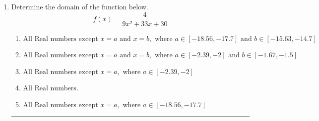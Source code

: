 \documentclass[14pt]{extbook}
\newcommand{\litem}[1]{\item#1\hspace*{-1cm}\rule{\textwidth}{0.4pt}}
\begin{document}
\begin{enumerate}
{\begin{enumerate}[label=\Alph*.]
\end{enumerate} }
\litem{
Determine the domain of the function below.\[ f(x) = \frac{4}{9x^{2} +33 x + 30} \]\begin{enumerate}[label=\Alph*.]
\item \( \text{All Real numbers except } x = a \text{ and } x = b, \text{ where } a \in [-18.56, -17.7] \text{ and } b \in [-15.63, -14.7] \)
\item \( \text{All Real numbers except } x = a \text{ and } x = b, \text{ where } a \in [-2.39, -2] \text{ and } b \in [-1.67, -1.5] \)
\item \( \text{All Real numbers except } x = a, \text{ where } a \in [-2.39, -2] \)
\item \( \text{All Real numbers.} \)
\item \( \text{All Real numbers except } x = a, \text{ where } a \in [-18.56, -17.7] \)


\end{enumerate}}
\end{enumerate}
\end{document}
